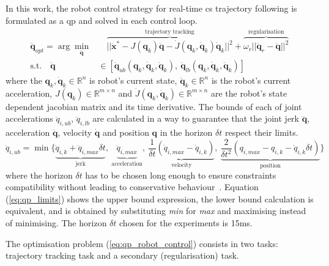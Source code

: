 In this work, the robot control strategy for real-time \gls{cs} trajectory following is formulated as a \gls{qp} and solved in each control loop. 
\begin{equation}
\begin{split}
    \ddot{\bm{q}}_{opt} = \arg \min_{\ddot{\bm{q}}}& \quad \overbrace{|| \ddot{\bm{x}}^* - J(\bm{q}_k)\ddot{\bm{q}} - \dot{J}(\bm{q}_k,\dot{\bm{q}}_k)\dot{\bm{q}}_k ||^2}^{\text{trajectory tracking}} + \overbrace{\omega_r || \ddot{\bm{q}}_r - \ddot{\bm{q}} ||^2}^{\text{regularisation}} \\
    \text{s.t.} \quad \ddot{\bm{q}} &\in [\ddot{\bm{q}}_{ub}(\bm{q}_k,\dot{\bm{q}}_k,\ddot{\bm{q}}_k), ~\ddot{\bm{q}}_{lb}(\bm{q}_k,\dot{\bm{q}}_k,\ddot{\bm{q}}_k)]
\end{split}
\label{eq:qp_robot_control}
\end{equation}
where the $\bm{q}_k,\dot{\bm{q}}_k\in\mathbb{R}^n$ is robot's current state, $\ddot{\bm{q}}_k\in\mathbb{R}^n$ is the robot's current acceleration, $J(\bm{q}_k)\in\mathbb{R}^{m\times n}$ and $\dot{J}(\bm{q}_k,\dot{\bm{q}}_k)\in\mathbb{R}^{m\times n}$ are the robot's state dependent jacobian matrix and its time derivative. The bounds of each of joint accelerations $\ddot{{q}}_{i,ub}$, $\ddot{{q}}_{i,lb}$ are calculated in a way to guarantee that the joint jerk $\dddot{\bm{q}}$, acceleration $\ddot{\bm{q}}$, velocity $\dot{\bm{q}}$ and position $\bm{q}$ in the horizon $\delta t$ respect their limits. 
\begin{equation}
    \ddot{{q}}_{i,ub} = \min  \Big\{ \underbrace{\ddot{{q}}_{i,k} + \dddot{q}_{i,max}\delta t}_{\text{jerk}}, ~
    \underbrace{\ddot{{q}}_{i,max}}_{\text{acceleration}}, ~ 
    \underbrace{\frac{1}{\delta  t}(\dot{{q}}_{i,max} - \dot{{q}}_{i,k})}_{\text{velocity}}, ~
    \underbrace{\frac{2}{\delta  t^2}({{q}}_{i,max} - {{q}}_{i,k} - \dot{{q}}_{i,k}\delta  t )}_{\text{position}}
    \Big\}  
\label{eq:qp_limits}
\end{equation}
where the horizon $\delta t$ has to be chosen long enough to ensure constraints compatibility without leading to conservative behaviour~\cite{Prete2018}. Equation (\ref{eq:qp_limits}) shows the upper bound expression, the lower bound calculation is equivalent, and is obtained by substituting \textit{min} for \textit{max} and maximising instead of minimising.  The horizon $\delta t$ chosen for the experiments is 15ms. 

The optimisation problem  (\ref{eq:qp_robot_control}) consists in two tasks: trajectory tracking task and a secondary (regularisation) task.

